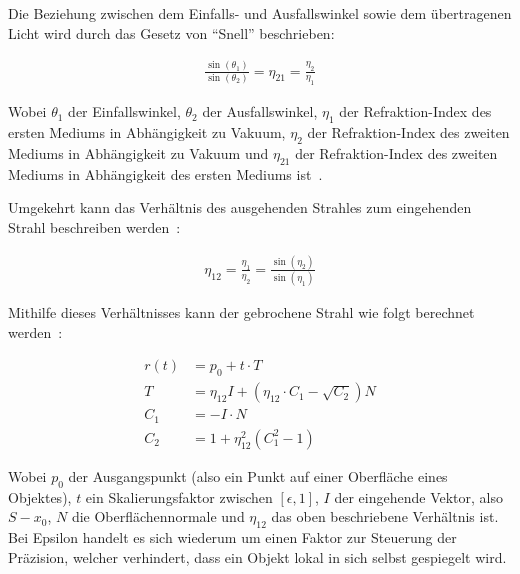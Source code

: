 Die Beziehung zwischen dem Einfalls- und Ausfallswinkel sowie dem
übertragenen Licht wird durch das Gesetz von ``Snell'' beschrieben:

\begin{gather}
    \frac{\sin(\theta_{1})}{\sin(\theta_{2})} = \eta_{21} = \frac{\eta_{2}}{\eta_{1}}
\end{gather}

Wobei $\theta_{1}$ der Einfallswinkel, $\theta_{2}$
der Ausfallswinkel, $\eta_{1}$ der Refraktion-Index des ersten Mediums
in Abhängigkeit zu Vakuum, $\eta_{2}$ der Refraktion-Index des zweiten
Mediums in Abhängigkeit zu Vakuum und $\eta_{21}$ der Refraktion-Index
des zweiten Mediums in Abhängigkeit des ersten Mediums
ist~\parencite[S. 134 bis 135]{glassner_introduction_1989}.

Umgekehrt kann das Verhältnis des ausgehenden Strahles zum eingehenden
Strahl beschreiben werden~\parencite[S. 137 bis 140]{glassner_introduction_1989}:

\begin{gather}
    \eta_{12} = \frac{\eta_{1}}{\eta_{2}} = \frac{\sin(\eta_{2})}{\sin(\eta_{1})}
\end{gather}

Mithilfe dieses Verhältnisses kann der gebrochene Strahl wie folgt
berechnet werden~\parencite[S. 137 bis 140]{glassner_introduction_1989}:

\begin{align}
    r(t) &= p_{0} + t \cdot T \\
    T &= \eta_{12}I + (\eta_{12} \cdot C_{1} - \sqrt{C_{2}})N
    \label{eq:ray_tracing:transm} \\
    C_{1} &= -I \cdot N \\
    C_{2} &= 1 + \eta_{12}^{2}(C_{1}^{2} - 1) \label{eq:ray_tracing:transm_c2}
\end{align}

Wobei $p_{0}$ der Ausgangspunkt (also ein Punkt auf einer Oberfläche
eines Objektes), $t$ ein Skalierungsfaktor zwischen $[\epsilon, 1]$, $I$
der eingehende Vektor, also $S - x_{0}$, $N$ die Oberflächennormale und
$\eta_{12}$ das oben beschriebene Verhältnis ist.
Bei Epsilon handelt es sich wiederum um einen Faktor zur Steuerung
der Präzision, welcher verhindert, dass ein Objekt lokal in sich selbst
gespiegelt wird.

